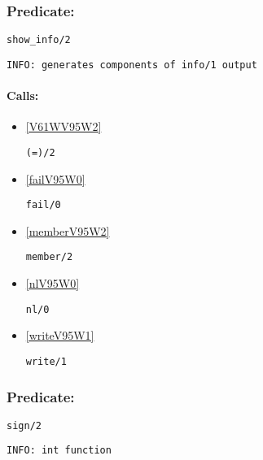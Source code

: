 \subsubsection{Predicate:} \label{showV95WinfoV95W2}

\begin{verbatim}
show_info/2
\end{verbatim}

{\small \begin{verbatim}
INFO: generates components of info/1 output

\end{verbatim}}
\paragraph{Calls:} 
\begin{itemize}
\item \ref{V61WV95W2} 
\begin{verbatim}
(=)/2
\end{verbatim}

\item \ref{failV95W0} 
\begin{verbatim}
fail/0
\end{verbatim}

\item \ref{memberV95W2} 
\begin{verbatim}
member/2
\end{verbatim}

\item \ref{nlV95W0} 
\begin{verbatim}
nl/0
\end{verbatim}

\item \ref{writeV95W1} 
\begin{verbatim}
write/1
\end{verbatim}

\end{itemize}

\subsubsection{Predicate:} \label{signV95W2}

\begin{verbatim}
sign/2
\end{verbatim}

{\small \begin{verbatim}
INFO: int function

\end{verbatim}}
